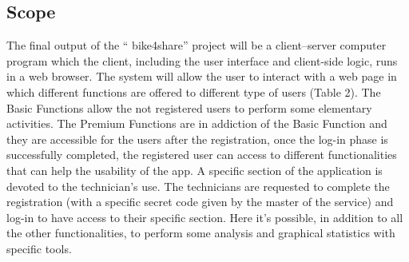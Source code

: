 \documentclass{article}
\begin{document}
\subsection{Scope}
The final output of the “ bike4share” project will be a client–server computer program which the client, including the user interface and client-side logic, runs in a web browser.
The system will allow  the user to interact with a web page in which different functions are offered to different type of users (Table 2).
The Basic Functions allow the not registered users to perform some elementary activities.  
The Premium Functions are in addiction of the Basic Function and they are  accessible for the users after the registration, once the log-in phase is successfully completed, the registered user can access to different functionalities that can help the usability of the app.
A specific section of the application is devoted to the technician’s use. 
The technicians are requested to complete the registration (with a specific secret code given by the master of the service) and log-in to have access to their specific section. Here it's possible, in addition to all the other functionalities, to perform some analysis and graphical statistics with specific tools.
\end{document}
